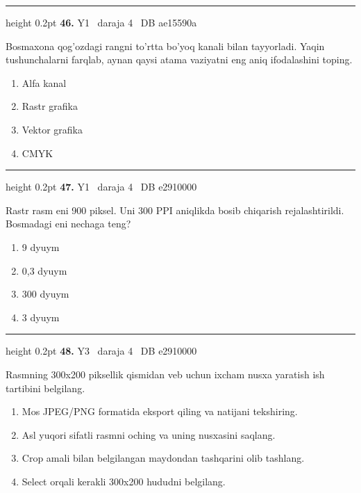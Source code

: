 \documentclass[10pt,a4paper,oneside]{article}
\begin{document}
\vspace{2mm}\hrule height 0.2pt \vspace{4mm}
\hypertarget{q46}{\textbf{\color{ink}46.}}  {\color{muted}\scriptsize Y1 \textbullet\ daraja 4 \textbullet\ DB ae15590a}
\par
Bosmaxona qog'ozdagi rangni to'rtta bo'yoq kanali bilan tayyorladi. Yaqin tushunchalarni farqlab, aynan qaysi atama vaziyatni eng aniq ifodalashini toping.
\begin{enumerate}[label=\Alph*),leftmargin=9mm]
\item Alfa kanal
\item Rastr grafika
\item Vektor grafika
\item CMYK
\end{enumerate}
\vspace{2mm}\hrule height 0.2pt \vspace{4mm}
\hypertarget{q47}{\textbf{\color{ink}47.}}  {\color{muted}\scriptsize Y1 \textbullet\ daraja 4 \textbullet\ DB e2910000}
\par
Rastr rasm eni 900 piksel. Uni 300 PPI aniqlikda bosib chiqarish rejalashtirildi. Bosmadagi eni nechaga teng?
\begin{enumerate}[label=\Alph*),leftmargin=9mm]
\item 9 dyuym
\item 0,3 dyuym
\item 300 dyuym
\item 3 dyuym
\end{enumerate}
\vspace{2mm}\hrule height 0.2pt \vspace{4mm}
\hypertarget{q48}{\textbf{\color{ink}48.}}  {\color{muted}\scriptsize Y3 \textbullet\ daraja 4 \textbullet\ DB e2910000}
\par
Rasmning 300x200 piksellik qismidan veb uchun ixcham nusxa yaratish ish tartibini belgilang.
\begin{enumerate}[label=\Alph*),leftmargin=9mm]
\item Mos JPEG/PNG formatida eksport qiling va natijani tekshiring.
\item Asl yuqori sifatli rasmni oching va uning nusxasini saqlang.
\item Crop amali bilan belgilangan maydondan tashqarini olib tashlang.
\item Select orqali kerakli 300x200 hududni belgilang.
\end{enumerate}
\end{document}
